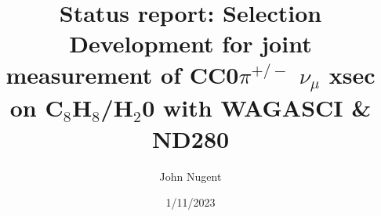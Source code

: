 \documentclass{beamer}
\title[WAGASCI/ND280 CC0\pi^{+/-} Analysis]{Status report: Selection Development for joint measurement of CC0$\pi^{+/-}$ ${\nu}_{\mu}$ xsec on C$_8$H$_8$/H$_2$0 with WAGASCI \& ND280} %
\author{John Nugent} %
\institute[TU] %
{Tohoku University\\ %
\medskip
\textit{john.nugent.d5@tohoku.ac.jp}} %
\date{1/11/2023} %
\begin{document}
%
\begin{frame}
\titlepage %
\end{frame}




% 
\end{document}
